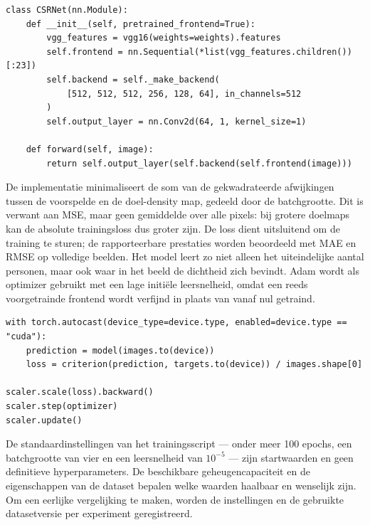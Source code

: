 \begin{listing}[htbp]
\begin{verbatim}
class CSRNet(nn.Module):
    def __init__(self, pretrained_frontend=True):
        vgg_features = vgg16(weights=weights).features
        self.frontend = nn.Sequential(*list(vgg_features.children())[:23])
        self.backend = self._make_backend(
            [512, 512, 512, 256, 128, 64], in_channels=512
        )
        self.output_layer = nn.Conv2d(64, 1, kernel_size=1)

    def forward(self, image):
        return self.output_layer(self.backend(self.frontend(image)))
\end{verbatim}
\caption{Vereenvoudigde opbouw en voorwaartse berekening van CSRNet.}
\label{lst:csrnet-forward}
\end{listing}

De implementatie minimaliseert de som van de gekwadrateerde afwijkingen tussen de voorspelde en de doel-density map, gedeeld door de batchgrootte. Dit is verwant aan MSE, maar geen gemiddelde over alle pixels: bij grotere doelmaps kan de absolute trainingsloss dus groter zijn. De loss dient uitsluitend om de training te sturen; de rapporteerbare prestaties worden beoordeeld met MAE en RMSE op volledige beelden. Het model leert zo niet alleen het uiteindelijke aantal personen, maar ook waar in het beeld de dichtheid zich bevindt. Adam wordt als optimizer gebruikt met een lage initiële leersnelheid, omdat een reeds voorgetrainde frontend wordt verfijnd in plaats van vanaf nul getraind.

\begin{listing}[htbp]
\begin{verbatim}
with torch.autocast(device_type=device.type, enabled=device.type == "cuda"):
    prediction = model(images.to(device))
    loss = criterion(prediction, targets.to(device)) / images.shape[0]

scaler.scale(loss).backward()
scaler.step(optimizer)
scaler.update()
\end{verbatim}
\caption{Eén trainingsstap met optionele mixed-precision op een GPU.}
\label{lst:training-step}
\end{listing}

De standaardinstellingen van het trainingsscript --- onder meer 100 epochs, een batchgrootte van vier en een leersnelheid van \(10^{-5}\) --- zijn startwaarden en geen definitieve hyperparameters. De beschikbare geheugencapaciteit en de eigenschappen van de dataset bepalen welke waarden haalbaar en wenselijk zijn. Om een eerlijke vergelijking te maken, worden de instellingen en de gebruikte datasetversie per experiment geregistreerd.

